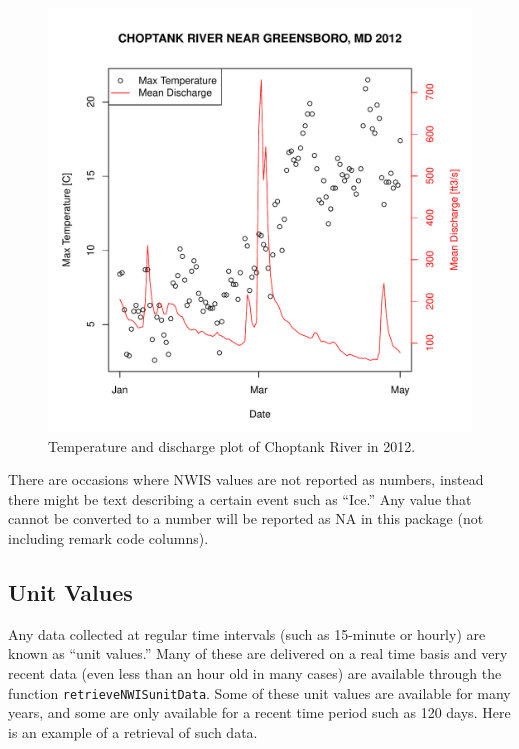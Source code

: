 \documentclass[a4paper,11pt]{article}\usepackage[]{graphicx}\usepackage[]{color}
\newenvironment{knitrout}{}{} %
\begin{document}
\begin{knitrout}
\begin{figure}[]
\includegraphics[width=1\linewidth,height=1\linewidth]{figure/getNWIStemperaturePlot} \caption[Temperature and discharge plot of Choptank River in 2012]{Temperature and discharge plot of Choptank River in 2012.\label{fig:getNWIStemperaturePlot}}
\end{figure}


\end{knitrout}


There are occasions where NWIS values are not reported as numbers, instead there might be text describing a certain event such as \enquote{Ice.}  Any value that cannot be converted to a number will be reported as NA in this package (not including remark code columns).

\FloatBarrier

\subsection{Unit Values}
\label{sec:usgsRT}
Any data collected at regular time intervals (such as 15-minute or hourly) are known as \enquote{unit values.} Many of these are delivered on a real time basis and very recent data (even less than an hour old in many cases) are available through the function \texttt{retrieveNWISunitData}.  Some of these unit values are available for many years, and some are only available for a recent time period such as 120 days.  Here is an example of a retrieval of such data.  
\end{document}
